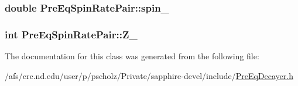 \hypertarget{classPreEqSpinRatePair_af88cd36daa52c5988fb000c0c67e49f9}{
\subsubsection[{spin\-\_\-}]{\setlength{\rightskip}{0pt plus 5cm}double Pre\-Eq\-Spin\-Rate\-Pair\-::spin\-\_\-}}\label{classPreEqSpinRatePair_af88cd36daa52c5988fb000c0c67e49f9}
\hypertarget{classPreEqSpinRatePair_afd6f7c07bd17e8fbdb7acabd763f2b92}{
\subsubsection[{Z\-\_\-}]{\setlength{\rightskip}{0pt plus 5cm}int Pre\-Eq\-Spin\-Rate\-Pair\-::\-Z\-\_\-}}\label{classPreEqSpinRatePair_afd6f7c07bd17e8fbdb7acabd763f2b92}


The documentation for this class was generated from the following file\-:\begin{DoxyCompactItemize}
\item 
/afs/crc.\-nd.\-edu/user/p/pscholz/\-Private/sapphire-\/devel/include/\hyperlink{PreEqDecayer_8h}{Pre\-Eq\-Decayer.\-h}\end{DoxyCompactItemize}
